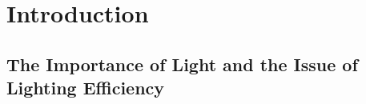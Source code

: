 \documentclass[energies,article,accept,moreauthors,pdftex]{Definitions/mdpi}\usepackage[]{graphicx}\usepackage[]{color}
\providecommand{\DIFdelbegin}{} %
\providecommand{\DIFdelend}{} %
\newcommand{\DIFscaledelfig}{0.5}
\newlength{\DIFdelgraphicswidth} %
\newlength{\DIFdelgraphicsheight} %
\newcommand{\DIFdelincludegraphics}[2][]{%
\sbox{\DIFdelgraphicsbox}{\DIFOincludegraphics[#1]{#2}}%
\settoboxwidth{\DIFdelgraphicswidth}{\DIFdelgraphicsbox} %
\settoboxtotalheight{\DIFdelgraphicsheight}{\DIFdelgraphicsbox} %
\scalebox{\DIFscaledelfig}{%
\parbox[b]{\DIFdelgraphicswidth}{\usebox{\DIFdelgraphicsbox}\\[-\baselineskip] \rule{\DIFdelgraphicswidth}{0em}}\llap{\resizebox{\DIFdelgraphicswidth}{\DIFdelgraphicsheight}{%
\setlength{\unitlength}{\DIFdelgraphicswidth}%
\begin{picture}(1,1)%
\thicklines\linethickness{2pt} %
{\color[rgb]{1,0,0}\put(0,0){\framebox(1,1){}}}%
{\color[rgb]{1,0,0}\put(0,0){\line( 1,1){1}}}%
{\color[rgb]{1,0,0}\put(0,1){\line(1,-1){1}}}%
\end{picture}%
}\hspace*{3pt}}} %
} %
\DeclareRobustCommand{\DIFdelbegin}{\DIFOdelbegin \let\includegraphics\DIFdelincludegraphics} %
\DeclareRobustCommand{\DIFdelend}{\DIFOaddend \let\includegraphics\DIFOincludegraphics} %
\begin{document}


\DIFdelbegin %

\DIFdelend %
\section{Introduction}
\label{sec:introduction}

\DIFdelbegin %

\DIFdelend %
\vspace{-6pt}
\subsection{The Importance of Light and the Issue of Lighting Efficiency}
\label{sec:lighting_importance}
\end{document}
